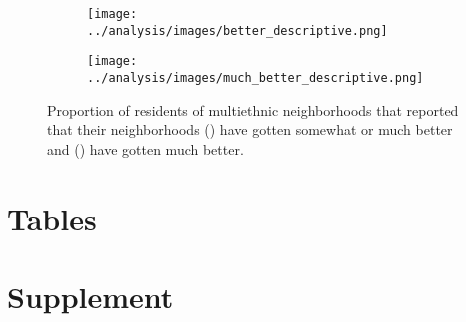 \documentclass[11pt]{baderart}
\begin{document}
\begin{sidewaysfigure}
\begin{subfigure}{.49\textwidth}
\texttt{[image: ../analysis/images/better\_descriptive.png]}
\caption{}
\label{subfig:better}
\end{subfigure}\quad\begin{subfigure}{.49\textwidth}
\texttt{[image: ../analysis/images/much\_better\_descriptive.png]}
\caption{}
\label{subfig:muchbetter}
\end{subfigure}
\caption{Proportion of residents of multiethnic neighborhoods that reported that their neighborhoods () have gotten somewhat or much better and () have gotten much better.}
\label{fig:improvement}
\end{sidewaysfigure}


\clearpage
\section{Tables}





\clearpage
\section{Supplement}


\end{document}
